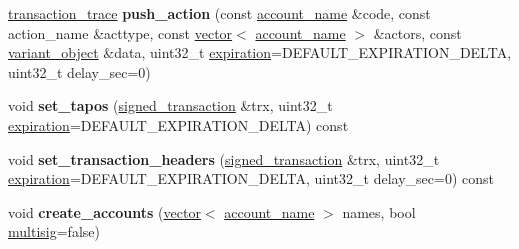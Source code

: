 \begin{DoxyCompactItemize}
\item 
\mbox{\label{classaacio_1_1testing_1_1base__tester_acb10b2a3578c833f24ad584fd106d4f5}} 
\mbox{\hyperlink{structaacio_1_1chain_1_1transaction__trace}{transaction\+\_\+trace}} {\bfseries push\+\_\+action} (const \mbox{\hyperlink{structaacio_1_1chain_1_1name}{account\+\_\+name}} \&code, const action\+\_\+name \&acttype, const \mbox{\hyperlink{classstd_1_1vector}{vector}}$<$ \mbox{\hyperlink{structaacio_1_1chain_1_1name}{account\+\_\+name}} $>$ \&actors, const \mbox{\hyperlink{classfc_1_1variant__object}{variant\+\_\+object}} \&data, uint32\+\_\+t \mbox{\hyperlink{group__transactioncapi_ga284f37e545cbb7f847f3ab86f50feb1d}{expiration}}=D\+E\+F\+A\+U\+L\+T\+\_\+\+E\+X\+P\+I\+R\+A\+T\+I\+O\+N\+\_\+\+D\+E\+L\+TA, uint32\+\_\+t delay\+\_\+sec=0)
\item 
\mbox{\label{classaacio_1_1testing_1_1base__tester_a3214eb4e0664270d9a227b022921f038}} 
void {\bfseries set\+\_\+tapos} (\mbox{\hyperlink{structaacio_1_1chain_1_1signed__transaction}{signed\+\_\+transaction}} \&trx, uint32\+\_\+t \mbox{\hyperlink{group__transactioncapi_ga284f37e545cbb7f847f3ab86f50feb1d}{expiration}}=D\+E\+F\+A\+U\+L\+T\+\_\+\+E\+X\+P\+I\+R\+A\+T\+I\+O\+N\+\_\+\+D\+E\+L\+TA) const
\item 
\mbox{\label{classaacio_1_1testing_1_1base__tester_ac87e7444c462b89bae7502ef95de11c7}} 
void {\bfseries set\+\_\+transaction\+\_\+headers} (\mbox{\hyperlink{structaacio_1_1chain_1_1signed__transaction}{signed\+\_\+transaction}} \&trx, uint32\+\_\+t \mbox{\hyperlink{group__transactioncapi_ga284f37e545cbb7f847f3ab86f50feb1d}{expiration}}=D\+E\+F\+A\+U\+L\+T\+\_\+\+E\+X\+P\+I\+R\+A\+T\+I\+O\+N\+\_\+\+D\+E\+L\+TA, uint32\+\_\+t delay\+\_\+sec=0) const
\item 
\mbox{\label{classaacio_1_1testing_1_1base__tester_a112e0c40d700cc84619a40d52bb656d3}} 
void {\bfseries create\+\_\+accounts} (\mbox{\hyperlink{classstd_1_1vector}{vector}}$<$ \mbox{\hyperlink{structaacio_1_1chain_1_1name}{account\+\_\+name}} $>$ names, bool \mbox{\hyperlink{classaacio_1_1multisig}{multisig}}=false)
\item 
\mbox{\label{classaacio_1_1testing_1_1base__tester_a0835643b1bc266ef3a6df2f905b61aea}} 

\end{DoxyCompactItemize}
